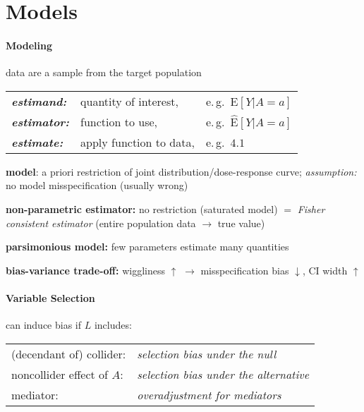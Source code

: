 \documentclass[8pt]{extarticle}
\begin{document}


\section{Models}

\begin{multicols}{2}

\paragraph{\large Modeling} data are a sample from the target population \vspace{0.4em}

\noindent \hspace{0.9em}\begin{tabular}{l l l}
\textbf{\it estimand:} & quantity  of interest, & e.\,g.\ $\mathrm{E}\left[Y|A=a\right]$ \\
\textbf{\it estimator:} & function to use, & e.\,g.\ $\widehat{\mathrm{E}}\left[Y|A=a\right]$ \\
\textbf{\it estimate:} & apply function to data, & e.\,g.\ $4.1$ 
\end{tabular} \vspace{0.5em}

\noindent \textbf{model}: a priori restriction of joint distribution/dose-response curve;  \textit{assumption:} no model misspecification (usually wrong)

\noindent \textbf{non-parametric estimator:} no restriction (saturated model) $=$ \textit{Fisher consistent estimator} (entire population data $\rightarrow$ true value)

\noindent \textbf{parsimonious model:} few parameters estimate many quantities

\noindent \textbf{bias-variance trade-off:} \newline wiggliness $\uparrow$ $\rightarrow$ misspecification bias $\downarrow$, CI width $\uparrow$

\paragraph{\large Variable Selection} can induce bias if $L$ includes: 

\hspace{-0.2em}\vspace{-1em}
\begin{tabular}{l l }
 (decendant of) collider:& \textit{selection bias under the null}\\
 noncollider effect of $A$:& \textit{selection bias under the alternative}\\
 mediator:& \textit{overadjustment for mediators}
\end{tabular}


\end{multicols}
\end{document}
